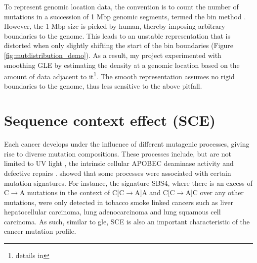 

To represent genomic location data, the convention is to count the number of mutations in a succession of 1 Mbp genomic segments, termed the bin method \citep{Kubler2019, Salvadores2019PassengerTumors, Chalmers2017AnalysisBurden, Salvadores2020MatchingPatterns}. However, the 1 Mbp size is picked by human, thereby imposing arbitrary boundaries to the genome. This leads to an unstable representation that is distorted when only slightly shifting the start of the bin boundaries (Figure \ref{fig:mutdistribution_demo}). As a result, my project experimented with smoothing GLE by estimating the \gls{density} at a genomic location based on the amount of data adjacent to it\footnote{details in }. The smooth representation assumes no rigid boundaries to the genome, thus less sensitive to the above pitfall. 


\newpage
\section{Sequence context effect (SCE)}
\label{intro:sce}

Each cancer develops under the influence of different mutagenic processes, giving rise to diverse mutation compositions. These processes include, but are not limited to UV light \citep[known in skin melanoma;][]{Mohania2017}, the intrinsic cellular APOBEC deaminase activity \citep[\textit{e.g.} in B cells;][]{Kuppers2005MechanismsPathogenesis} and defective repairs \citep[\textit{e.g.} mutated \textit{BRCA} genes in breast cancer;][]{Navasardyan2021YY1TNBC}. \citet{Alexandrov2013, Alexandrov2020} showed that some processes were associated with certain mutation signatures. For instance, the signature SBS4, where there is an excess of C$\rightarrow$A mutations in the context of C[C$\rightarrow$A]A and C[C$\rightarrow$A]C over any other mutations, were only detected in tobacco smoke linked cancers such as liver hepatocellular carcinoma, lung adenocarcinoma and lung squamous cell carcinoma. As such, similar to \gls{gle}, SCE is also an important characteristic of the cancer mutation profile. 

